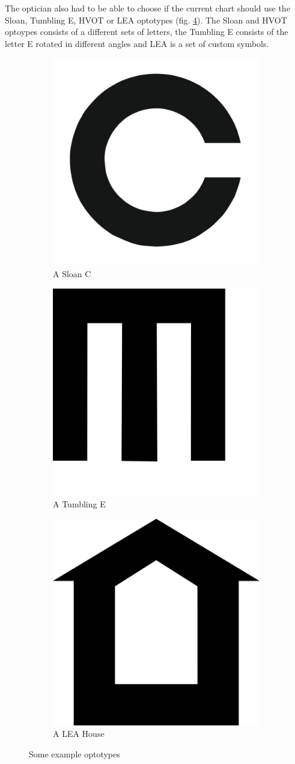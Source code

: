 \documentclass[12pt,a4paper,notitlepage]{report}
\begin{document}
The optician also had to be able to choose if the current chart should use the Sloan, Tumbling E, HVOT or LEA optotypes (fig. \ref{fig:optotypes_example1}). The Sloan and HVOT optoypes consists of a different sets of letters, the Tumbling E consists of the letter E rotated in different angles and LEA is a set of custom symbols. \cite{Colenbrander}

\begin{figure}[ht!]
\centering
\begin{subfigure}{.3\textwidth}
  \centering
  \includegraphics[width=.4\linewidth]{images/landholt_c_optotype.png}
  \caption{A Sloan C}
  \label{fig:landholt_c1}
\end{subfigure}%
\begin{subfigure}{.3\textwidth}
  \centering
  \includegraphics[width=.4\linewidth]{images/tumbling_e_optotype.png}
  \caption{A Tumbling E}
  \label{fig:tumbling_e1}
\end{subfigure}
\begin{subfigure}{.3\textwidth}
  \centering
  \includegraphics[width=.4\linewidth]{images/lea_optotype.png}
  \caption{A LEA House}
  \label{fig:lea1}
\end{subfigure}
\caption{Some example optotypes}
\label{fig:optotypes_example1}
\end{figure}
\end{document}
